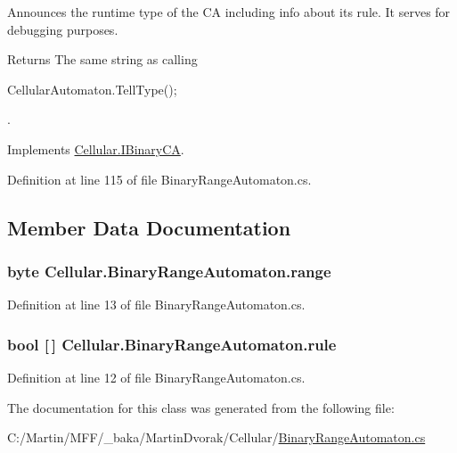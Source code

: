 Announces the runtime type of the C\+A including info about its rule. It serves for debugging purposes. 

\begin{DoxyReturn}{Returns}
The same string as calling 
\begin{DoxyCode}
CellularAutomaton.TellType();
\end{DoxyCode}
.
\end{DoxyReturn}


Implements \hyperlink{interface_cellular_1_1_i_binary_c_a_aa67feabf5d1513aa74076d255c661948}{Cellular.\+I\+Binary\+C\+A}.



Definition at line 115 of file Binary\+Range\+Automaton.\+cs.



\subsection{Member Data Documentation}
\hypertarget{class_cellular_1_1_binary_range_automaton_a9a391c738dc7725aa66a52dca039a2f7}{}
\subsubsection[{range}]{\setlength{\rightskip}{0pt plus 5cm}byte Cellular.\+Binary\+Range\+Automaton.\+range\hspace{0.3cm}{\ttfamily [protected]}}\label{class_cellular_1_1_binary_range_automaton_a9a391c738dc7725aa66a52dca039a2f7}


Definition at line 13 of file Binary\+Range\+Automaton.\+cs.

\hypertarget{class_cellular_1_1_binary_range_automaton_a4dda99c3151599c8ef12d08d7472144c}{}
\subsubsection[{rule}]{\setlength{\rightskip}{0pt plus 5cm}bool \mbox{[}$\,$\mbox{]} Cellular.\+Binary\+Range\+Automaton.\+rule\hspace{0.3cm}{\ttfamily [protected]}}\label{class_cellular_1_1_binary_range_automaton_a4dda99c3151599c8ef12d08d7472144c}


Definition at line 12 of file Binary\+Range\+Automaton.\+cs.



The documentation for this class was generated from the following file\+:\begin{DoxyCompactItemize}
\item 
C\+:/\+Martin/\+M\+F\+F/\+\_\+baka/\+Martin\+Dvorak/\+Cellular/\hyperlink{_binary_range_automaton_8cs}{Binary\+Range\+Automaton.\+cs}\end{DoxyCompactItemize}
